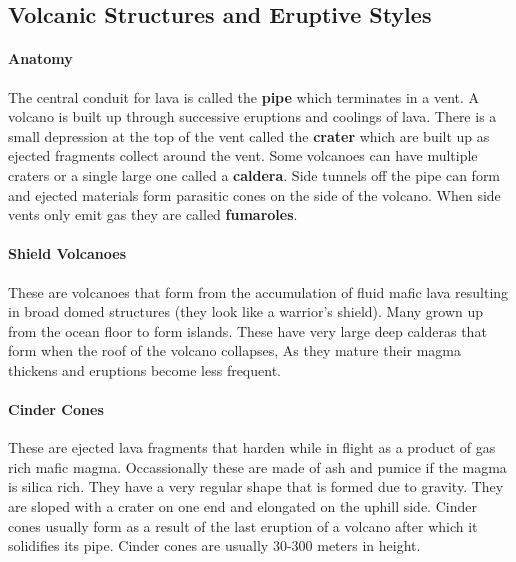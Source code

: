 \documentclass{article}
\begin{document}

\subsection*{Volcanic Structures and Eruptive Styles} %
\label{sub:volcanic_structures_and_eruptive_styles}

\paragraph{Anatomy} %
\label{par:anatomy}
The central conduit for lava is called the \textbf{pipe} which terminates in a vent. A volcano is built up through successive eruptions and coolings of lava. There is a small depression at the top of the vent called the \textbf{crater} which are built up as ejected fragments collect around the vent. Some volcanoes can have multiple craters or a single large one called a \textbf{caldera}. Side tunnels off the pipe can form and ejected materials form parasitic cones on the side of the volcano. When side vents only emit gas they are called \textbf{fumaroles}.

\paragraph{Shield Volcanoes} %
\label{par:shield_volcanoes}
These are volcanoes that form from the accumulation of fluid mafic lava resulting in broad domed structures (they look like a warrior's shield). Many grown up from the ocean floor to form islands. These have very large deep calderas that form when the roof of the volcano collapses, As they mature their magma thickens and eruptions become less frequent.

\paragraph{Cinder Cones} %
\label{par:cinder_cones}
These are ejected lava fragments that harden while in flight as a product of gas rich mafic magma. Occassionally these are made of ash and pumice if the magma is silica rich. They have a very regular shape that is formed due to gravity. They are sloped with a crater on one end and elongated on the uphill side. Cinder cones usually form as a result of the last eruption of a volcano after which it solidifies its pipe. Cinder cones are usually 30-300 meters in height.
\end{document}
